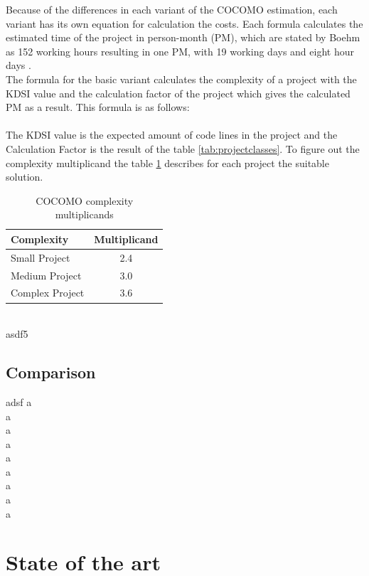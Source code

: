 Because of the differences in each variant of the COCOMO estimation, each variant has its own equation for calculation the costs. Each formula calculates the estimated time of the project in person-month (PM), which are stated by Boehm as 152 working hours resulting in one PM, with 19 working days and eight hour days \cite{boehm}. \\
The formula for the basic variant calculates the complexity of a project with the KDSI value and the calculation factor of the project which gives the calculated PM as a result. This formula is as follows:\\
\\
The KDSI value is the expected amount of code lines in the project and the Calculation Factor is the result of the table \ref{tab:projectclasses}. To figure out the complexity multiplicand the table \ref{cocomo:basicComplexity} describes for each project the suitable solution.\\
\begin{table}[h]
	\centering 
	\setlength{\tabcolsep}{4pt}
	\begin{tabular}{|l||c|}\hline
		Complexity	& Multiplicand\\ \hline\hline
		Small Project   	& 2.4        		\\ \hline
		Medium Project 		& 3.0        		\\ \hline
		Complex Project 	& 3.6 			\\ \hline
	\end{tabular} 
	\caption{COCOMO complexity multiplicands} 
	\label{cocomo:basicComplexity} 
\end{table}\\
asdf5

\subsection{Comparison}

adsf
a\\
a\\
a\\
a\\
a\\
a\\
a\\
a\\
a

\section{State of the art}

